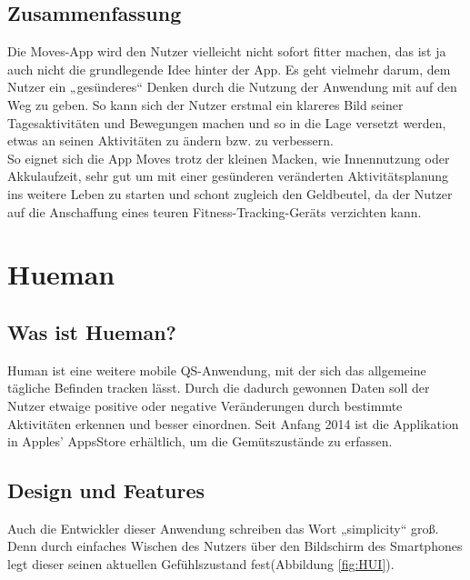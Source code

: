 \subsection{Zusammenfassung}
\label{ch:Apps:sec:Moves:subsec:VERDICT} 

Die Moves-App wird den Nutzer vielleicht nicht sofort fitter machen, das ist ja auch nicht die grundlegende Idee hinter der App. 
Es geht vielmehr darum, dem Nutzer ein „gesünderes“ Denken durch die Nutzung der Anwendung mit auf den Weg zu geben. 
So kann sich der Nutzer erstmal ein klareres Bild seiner Tagesaktivitäten und Bewegungen machen und so in die Lage versetzt werden, etwas an seinen Aktivitäten zu ändern bzw. zu verbessern.
\\
So eignet sich die App Moves trotz der kleinen Macken, wie Innennutzung oder Akkulaufzeit, sehr gut um mit einer gesünderen veränderten Aktivitätsplanung ins weitere Leben zu starten und schont zugleich den Geldbeutel, da der Nutzer auf die Anschaffung eines teuren Fitness-Tracking-Geräts verzichten kann.

\section{Hueman}
\label{ch:Apps:sec:Hueman}

\subsection{Was ist Hueman?}
\label{ch:Apps:sec:Hueman:subsec:WIH}

Human ist eine weitere mobile QS-Anwendung, mit der sich das allgemeine tägliche Befinden tracken lässt. 
Durch die dadurch gewonnen Daten soll der Nutzer etwaige positive oder negative Veränderungen durch bestimmte Aktivitäten erkennen und besser einordnen.
Seit Anfang 2014 ist die Applikation in Apples' AppsStore erhältlich, um die Gemütszustände zu erfassen.


\subsection{Design und Features}
\label{ch:Apps:sec:Hueman:subsec:DuFe}

Auch die Entwickler dieser Anwendung schreiben das Wort „simplicity“ groß. 
Denn durch einfaches Wischen des Nutzers über den Bildschirm des Smartphones legt dieser seinen aktuellen Gefühlszustand fest(Abbildung \ref{fig:HUI}).

